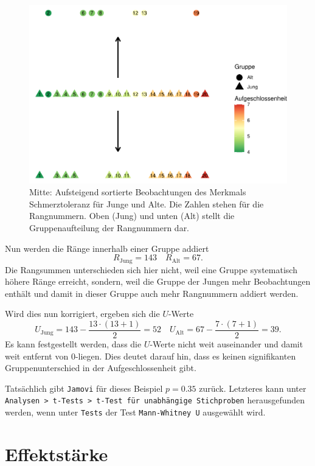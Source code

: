 \documentclass[
]{book}
\theoremstyle{definition}
\theoremstyle{definition}
\theoremstyle{definition}
\theoremstyle{definition}
\theoremstyle{remark}
\begin{document}
\begin{figure}
\centering
\includegraphics{aps_statistik1_files/figure-latex/exm-aufgeschlossenheit-jung-alt-utest-oder-1.pdf}
\caption{\label{fig:exm-aufgeschlossenheit-jung-alt-utest-oder}Mitte: Aufsteigend sortierte Beobachtungen des Merkmals Schmerztoleranz für Junge und Alte. Die Zahlen stehen für die Rangnummern. Oben (Jung) und unten (Alt) stellt die Gruppenaufteilung der Rangnummern dar.}
\end{figure}

Nun werden die Ränge innerhalb einer Gruppe addiert
\[R_\text{Jung} = 143   \quad R_\text{Alt} = 67.\] Die Rangsummen
unterschieden sich hier nicht, weil eine Gruppe systematisch höhere
Ränge erreicht, sondern, weil die Gruppe der Jungen mehr Beobachtungen
enthält und damit in dieser Gruppe auch mehr Rangnummern addiert werden.

Wird dies nun korrigiert, ergeben sich die \(U\)-Werte
\[U_\text{Jung} = 143 - \frac{13\cdot(13+1)}{2} = 52 \quad U_\text{Alt} = 67-\frac{7\cdot(7+1)}{2} = 39.\]
Es kann festgestellt werden, dass die \(U\)-Werte nicht weit auseinander
und damit weit entfernt von \(0\)-liegen. Dies deutet darauf hin, dass es
keinen signifikanten Gruppenunterschied in der Aufgeschlossenheit gibt.

Tatsächlich gibt \texttt{Jamovi} für dieses Beispiel \(p = 0.35\) zurück.
Letzteres kann unter
\texttt{Analysen\ \textgreater{}\ t-Tests\ \textgreater{}\ t-Test\ für\ unabhängige\ Stichproben} herausgefunden
werden, wenn unter \texttt{Tests} der Test \texttt{Mann-Whitney\ U} ausgewählt wird.

\section{Effektstärke}\label{u-test-effect}
\end{document}

